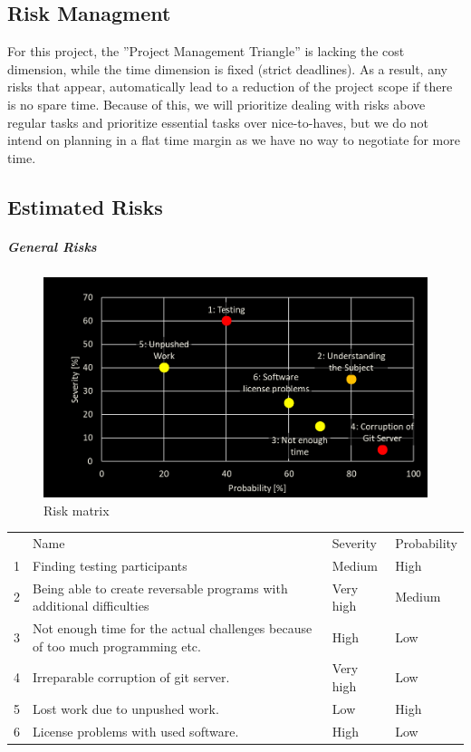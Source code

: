 \subsection{Risk Managment}
For this project, the ”Project Management Triangle” is lacking the cost dimension, while the time dimension is fixed (strict deadlines). As a result, any risks that appear, automatically lead to a reduction of the project scope if there is no spare time. Because of this, we will prioritize dealing with risks above regular tasks and prioritize essential tasks over nice-to-haves, but we do not intend on planning in a flat time margin as we have no way to negotiate for more time.

\subsection{Estimated Risks}

\subparagraph{General Risks}

\begin{figure}[H]
  \includegraphics[width=\linewidth]{resources/risk-matrix.png}
  \caption{Risk matrix}
  \label{risk_matrix}
\end{figure}

\begin{table}[]
    \begin{tabular}{llll}
      & Name                                                                           & Severity  & Probability \\
    1 & Finding testing participants                                                   & Medium    & High        \\
    2 & Being able to create reversable programs with additional difficulties          & Very high & Medium      \\
    3 & Not enough time for the actual challenges because of too much programming etc. & High      & Low         \\
    4 & Irreparable corruption of git server.                                          & Very high & Low         \\
    5 & Lost work due to unpushed work.                                                & Low       & High        \\
    6 & License problems with used software.                                           & High      & Low        
    \end{tabular}
\end{table}

